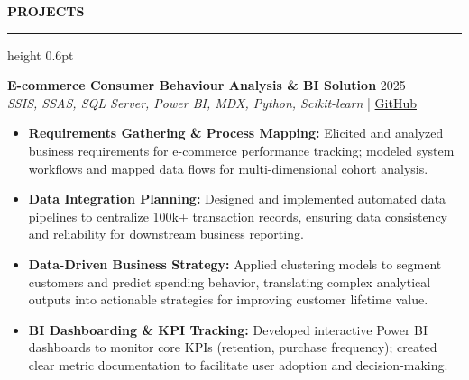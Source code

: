 ﻿\documentclass{resume}
\renewcommand{\sectionskip}{\vspace{5pt}}
\renewcommand{\sectionlineskip}{\vspace{3pt}}
\renewenvironment{rSection}[1]{
  \sectionskip
  {\color{headerblue}\textbf{\MakeUppercase{#1}}}
  \sectionlineskip
  {\color{rulegray}\hrule height 0.6pt}
  \vspace{0pt}
  \begin{list}{}{
    \setlength{\leftmargin}{0em}
    \setlength{\topsep}{0pt}
    \setlength{\partopsep}{0pt}
    \setlength{\parsep}{0pt}
    \setlength{\itemsep}{0pt}
  }
  \item[]
}{
  \end{list}
}
\begin{document}
\begin{rSection}{Projects}
    \item \textbf{E-commerce Consumer Behaviour Analysis \& BI Solution} \hfill 2025\\
    {\small \textit{SSIS, SSAS, SQL Server, Power BI, MDX, Python, Scikit-learn}} \hfill | \href{https://github.com/vietpham10205/Datawarehouse-Olap_Project-E-commerce-Consumer-Behavior-Analysis-BI-Solution}{GitHub}
    {\small
    \begin{itemize}[itemsep=4pt, parsep=0pt, leftmargin=1.2em]
        \item \textbf{Requirements Gathering \& Process Mapping:} Elicited and analyzed business requirements for e-commerce performance tracking; modeled system workflows and mapped data flows for multi-dimensional cohort analysis.
        \item \textbf{Data Integration Planning:} Designed and implemented automated data pipelines to centralize 100k+ transaction records, ensuring data consistency and reliability for downstream business reporting.
        \item \textbf{Data-Driven Business Strategy:} Applied clustering models to segment customers and predict spending behavior, translating complex analytical outputs into actionable strategies for improving customer lifetime value.
        \item \textbf{BI Dashboarding \& KPI Tracking:} Developed interactive Power BI dashboards to monitor core KPIs (retention, purchase frequency); created clear metric documentation to facilitate user adoption and decision-making.
    \end{itemize}
    }
    \vspace{15pt}


\end{rSection}
\end{document}
